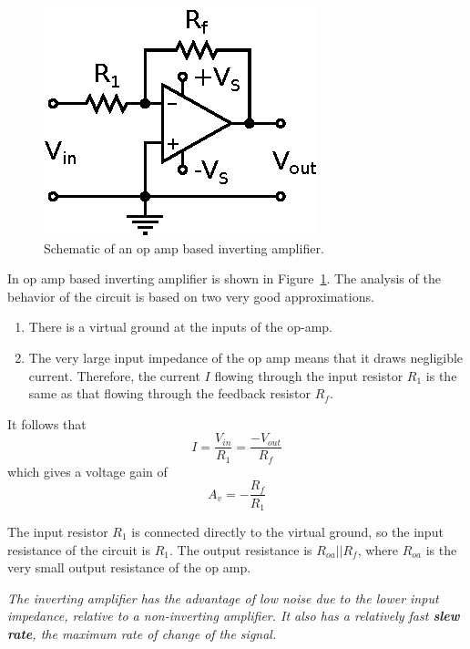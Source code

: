 \documentclass[11pt]{article}
\begin{document}
\begin{figure}[ht]
  \begin{center}
    \includegraphics{invertingamp.eps}
    \caption{Schematic of an op amp based inverting amplifier.}
    \label{fig:invertingamp}
  \end{center}
\end{figure}

In op amp based inverting amplifier is shown in
Figure~\ref{fig:invertingamp}. The analysis of the behavior of the
circuit is based on two very good approximations.
\begin{enumerate}
\item There is a virtual ground at the inputs of the op-amp.
  
\item The very large input impedance of the op amp means that it
  draws negligible current. Therefore, the current $I$ flowing through
  the input resistor $R_1$ is the same as that flowing through the
  feedback resistor $R_f$.
\end{enumerate}
It follows that
\begin{equation}
  I = \frac{V_{in}}{R_1} = \frac{-V_{out}}{R_f}
\end{equation}
which gives a voltage gain of
\begin{equation}
  A_v = -\frac{R_f}{R_1}
  \label{eq:invampgain}
\end{equation}

The input resistor $R_1$ is connected directly to the virtual ground,
so the input resistance of the circuit is $R_1$. The output resistance
is $R_{oa}||R_f$, where $R_{oa}$ is the very small output resistance
of the op amp.

\emph{The inverting amplifier has the advantage of low noise due to
  the lower input impedance, relative to a non-inverting amplifier. It
  also has a relatively fast \textbf{slew rate}, the maximum rate of
  change of the signal.}
\end{document}
